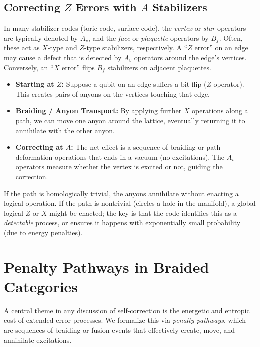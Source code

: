 \documentclass[12pt]{article}
\begin{document}
\subsection{Correcting $Z$ Errors with $A$ Stabilizers}
In many stabilizer codes (toric code, surface code), the \emph{vertex} or \emph{star} operators are typically denoted by $A_v$, and the \emph{face} or \emph{plaquette} operators by $B_f$. Often, these act as $X$-type and $Z$-type stabilizers, respectively. A “$Z$ error” on an edge may cause a defect that is detected by $A_v$ operators around the edge’s vertices. Conversely, an “$X$ error” flips $B_f$ stabilizers on adjacent plaquettes.

\begin{itemize}
\item \textbf{Starting at $Z$:} Suppose a qubit on an edge suffers a bit-flip ($Z$ operator). This creates pairs of anyons on the vertices touching that edge. 
\item \textbf{Braiding / Anyon Transport:} By applying further $X$ operations along a path, we can move one anyon around the lattice, eventually returning it to annihilate with the other anyon. 
\item \textbf{Correcting at $A$:} The net effect is a sequence of braiding or path-deformation operations that ends in a vacuum (no excitations). The $A_v$ operators measure whether the vertex is excited or not, guiding the correction. 
\end{itemize}

If the path is homologically trivial, the anyons annihilate without enacting a logical operation. If the path is nontrivial (circles a hole in the manifold), a global logical $Z$ or $X$ might be enacted; the key is that the code identifies this as a \emph{detectable} process, or ensures it happens with exponentially small probability (due to energy penalties).

\section{Penalty Pathways in Braided Categories}\label{sec:penalty_pathways}
A central theme in any discussion of self-correction is the energetic and entropic cost of extended error processes. We formalize this via \emph{penalty pathways}, which are sequences of braiding or fusion events that effectively create, move, and annihilate excitations.
\end{document}
